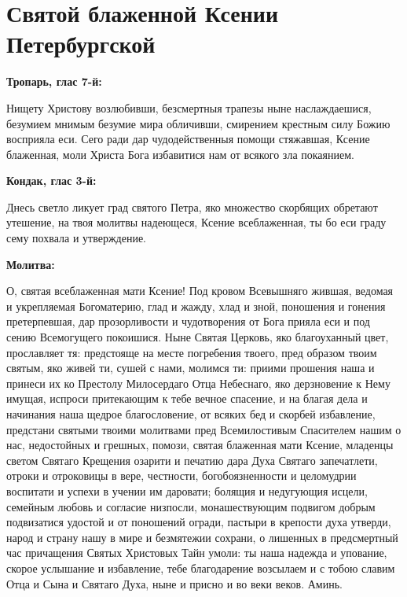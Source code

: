 
 

\section{Святой блаженной Ксении Петербургской}
 
\bfseries Тропарь, глас 7-й:\normalfont{}\nopagebreak


Нищету Христову возлюбивши, безсмертныя трапезы ныне наслаждаешися, безумием мнимым безумие мира обличивши, смирением крестным силу Божию восприяла еси. Сего ради дар чудодейственныя помощи стяжавшая, Ксение блаженная, моли Христа Бога избавитися нам от всякого зла покаянием.


\medskip
\bfseries Кондак, глас 3-й:\normalfont{}\nopagebreak


Днесь светло ликует град святого Петра, яко множество скорбящих обретают утешение, на твоя молитвы надеющеся, Ксение всеблаженная, ты бо еси граду сему похвала и утверждение.


\medskip
\bfseries Молитва:\normalfont{}\nopagebreak


О, святая всеблаженная мати Ксение! Под кровом Всевышняго жившая, ведомая и укрепляемая Богоматерию, глад и жажду, хлад и зной, поношения и гонения претерпевшая, дар прозорливости и чудотворения от Бога прияла еси и под сению Всемогущего покоишися. Ныне Святая Церковь, яко благоуханный цвет, прославляет тя: предстояще на месте погребения твоего, пред образом твоим святым, яко живей ти, сушей с нами, молимся ти: приими прошения наша и принеси их ко Престолу Милосердаго Отца Небеснаго, яко дерзновение к Нему имущая, испроси притекающим к тебе вечное спасение, и на благая дела и начинания наша щедрое благословение, от всяких бед и скорбей избавление, предстани святыми твоими молитвами пред Всемилостивым Спасителем нашим о нас, недостойных и грешных, помози, святая блаженная мати Ксение, младенцы светом Святаго Крещения озарити и печатию дара Духа Святаго запечатлети, отроки и отроковицы в вере, честности, богобоязненности и целомудрии воспитати и успехи в учении им даровати; болящия и недугующия исцели, семейным любовь и согласие низпосли, монашествующим подвигом добрым подвизатися удостой и от поношений огради, пастыри в крепости духа утверди, народ и страну нашу в мире и безмятежии сохрани, о лишенных в предсмертный час причащения Святых Христовых Тайн умоли: ты наша надежда и упование, скорое услышание и избавление, тебе благодарение возсылаем и с тобою славим Отца и Сына и Святаго Духа, ныне и присно и во веки веков. Аминь.

